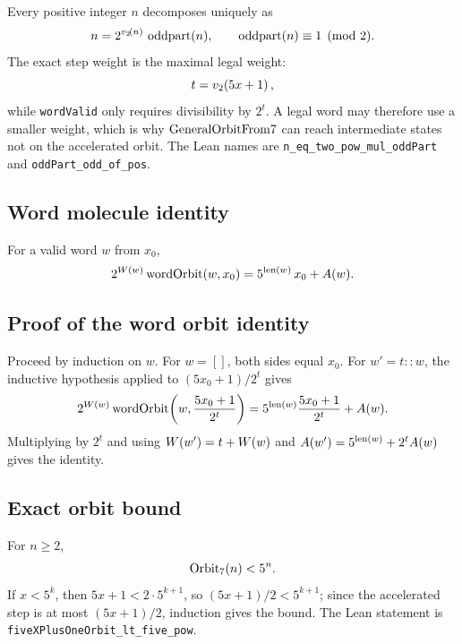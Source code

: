 Every positive integer $n$ decomposes uniquely as
\begin{equation*}
  n=2^{v_2\!\left(n\right)}\,\operatorname{oddpart}(n),
\qquad \operatorname{oddpart}(n)\equiv1\pmod2.
\end{equation*}
The exact step weight is the maximal legal weight:
\begin{equation*}
  t=v_2\!\left(5x+1\right),
\end{equation*}
while \texttt{wordValid} only requires divisibility by $2^t$.  A legal
word may therefore use a smaller weight, which is why
$\mathrm{GeneralOrbitFrom7}$ can reach intermediate states not on the accelerated
orbit.  The Lean names are \texttt{n\_eq\_two\_pow\_mul\_oddPart} and
\texttt{oddPart\_odd\_of\_pos}.

\subsection{Word molecule identity}

For a valid word $w$ from $x_0$,
\begin{equation*}
  2^{W(w)}\,\mathrm{wordOrbit}(w,x_0)
    =5^{\operatorname{len}(w)}\,x_0+A(w).
\end{equation*}

\subsection{Proof of the word orbit identity}

Proceed by induction on $w$.  For $w=[]$, both sides equal $x_0$.  For
$w'=t::w$, the inductive hypothesis applied to
$(5x_0+1)/2^t$ gives
\begin{equation*}
  2^{W(w)}\,\mathrm{wordOrbit}\!\left(w,\frac{5x_0+1}{2^t}\right)
    =5^{\operatorname{len}(w)}\frac{5x_0+1}{2^t}+A(w).
\end{equation*}
Multiplying by $2^t$ and using $W(w')=t+W(w)$ and
$A(w')=5^{\operatorname{len}(w)}+2^tA(w)$ gives the identity.

\subsection{Exact orbit bound}

For $n\ge2$,
\begin{equation*}
  \mathrm{Orbit}_7(n)<5^n.
\end{equation*}
If $x<5^k$, then $5x+1<2\cdot5^{k+1}$, so $(5x+1)/2<5^{k+1}$; since
the accelerated step is at most $(5x+1)/2$, induction gives the
bound.  The Lean statement is
\texttt{fiveXPlusOneOrbit\_lt\_five\_pow}.

